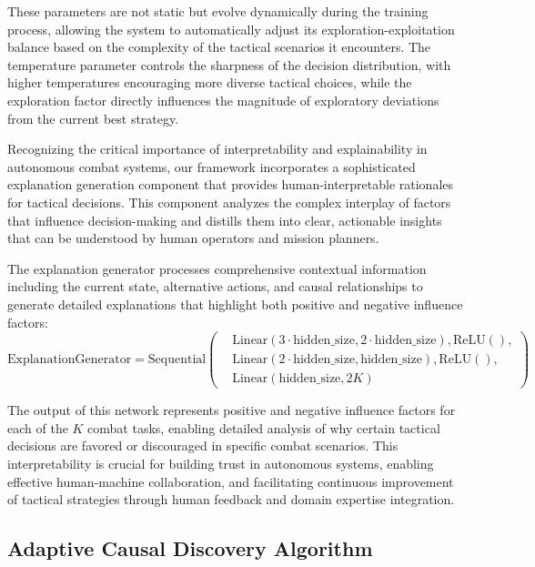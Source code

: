 \documentclass[12pt]{article}
\begin{document}
These parameters are not static but evolve dynamically during the training process, allowing the system to automatically adjust its exploration-exploitation balance based on the complexity of the tactical scenarios it encounters. The temperature parameter controls the sharpness of the decision distribution, with higher temperatures encouraging more diverse tactical choices, while the exploration factor directly influences the magnitude of exploratory deviations from the current best strategy.

Recognizing the critical importance of interpretability and explainability in autonomous combat systems, our framework incorporates a sophisticated explanation generation component that provides human-interpretable rationales for tactical decisions. This component analyzes the complex interplay of factors that influence decision-making and distills them into clear, actionable insights that can be understood by human operators and mission planners.

The explanation generator processes comprehensive contextual information including the current state, alternative actions, and causal relationships to generate detailed explanations that highlight both positive and negative influence factors:
\begin{equation}
\text{ExplanationGenerator} = \text{Sequential}(
\begin{aligned}
&\text{Linear}(3 \cdot \text{hidden\_size}, 2 \cdot \text{hidden\_size}), \text{ReLU}(), \\
&\text{Linear}(2 \cdot \text{hidden\_size}, \text{hidden\_size}), \text{ReLU}(), \\
&\text{Linear}(\text{hidden\_size}, 2K)
\end{aligned}
)
\end{equation}

The output of this network represents positive and negative influence factors for each of the $K$ combat tasks, enabling detailed analysis of why certain tactical decisions are favored or discouraged in specific combat scenarios. This interpretability is crucial for building trust in autonomous systems, enabling effective human-machine collaboration, and facilitating continuous improvement of tactical strategies through human feedback and domain expertise integration.

\subsection{Adaptive Causal Discovery Algorithm}
\end{document}
